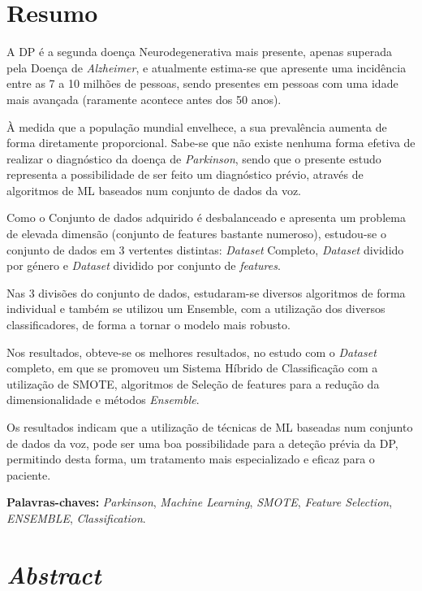 \documentclass[12pt,a4paper,twoside]{report}
\begin{document}
\chapter*{Resumo}

A \gls{DP} é  a segunda doença Neurodegenerativa mais presente, apenas superada pela Doença de \textit{Alzheimer}, e atualmente estima-se que apresente uma incidência entre as 7 a 10 milhões de pessoas, sendo presentes em pessoas com uma idade mais avançada (raramente acontece antes dos 50 anos). 

À medida que a população mundial envelhece,  a sua prevalência aumenta de forma diretamente proporcional. Sabe-se que não existe nenhuma forma efetiva de realizar o diagnóstico da doença de \textit{Parkinson}, sendo que o presente estudo representa a possibilidade de ser feito um diagnóstico prévio, através de algoritmos de \gls{ML}  baseados num conjunto de dados da voz. 

Como o Conjunto de dados adquirido é desbalanceado e apresenta um problema de elevada dimensão (conjunto de features bastante numeroso), estudou-se o conjunto de dados em 3 vertentes distintas: \textit{Dataset} Completo, \textit{Dataset} dividido por género e \textit{Dataset} dividido por conjunto de \textit{features}.

Nas 3 divisões do conjunto de dados, estudaram-se diversos algoritmos de forma individual e também se utilizou um Ensemble, com a utilização dos diversos classificadores, de forma a tornar o modelo mais robusto. 

Nos resultados, obteve-se os melhores resultados, no estudo com o \textit{Dataset} completo, em que se promoveu um Sistema Híbrido de Classificação com a utilização de \gls{SMOTE}, algoritmos de Seleção de features para a redução da dimensionalidade e métodos \textit{Ensemble}.

Os resultados indicam que a utilização de técnicas de \gls{ML}  baseadas num conjunto de dados da voz, pode ser uma boa possibilidade para a deteção prévia da \gls{DP}, permitindo desta forma, um tratamento mais especializado e eficaz para o paciente.


\textbf{Palavras-chaves:} \textit{Parkinson}, \textit{Machine Learning}, \textit{SMOTE}, \textit{Feature Selection}, \textit{ENSEMBLE}, \textit{Classification}.


\chapter*{\textit{Abstract}}
\end{document}
